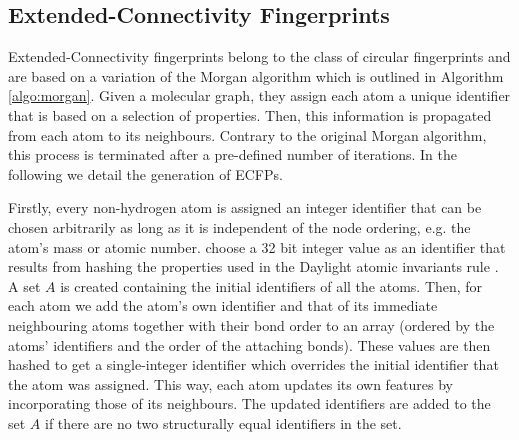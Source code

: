 \subsection{Extended-Connectivity Fingerprints}
\label{sec:circ_finger}

Extended-Connectivity fingerprints belong to the class of circular fingerprints and are based on a variation of the Morgan algorithm \citep{morgan} which is outlined in Algorithm \ref{algo:morgan}. Given a molecular graph, they assign each atom a unique identifier that is based on a selection of properties. Then, this information is propagated from each atom to its neighbours. Contrary to the original Morgan algorithm, this process is terminated after a pre-defined number of iterations. In the following we detail the generation of ECFPs.


Firstly, every non-hydrogen atom is assigned an integer identifier that can be chosen arbitrarily as long as it is independent of the node ordering, e.g. the atom's mass or atomic number. \cite{ECFP} choose a 32 bit integer value as an identifier that results from hashing the properties used in the Daylight atomic invariants rule \citep{smiles2}. A set $A$ is created containing the initial identifiers of all the atoms. Then, for each atom we add the atom's own identifier and that of its immediate neighbouring atoms together with their bond order to an array (ordered by the atoms' identifiers and the order of the attaching bonds). These values are then hashed to get a single-integer identifier which overrides the initial identifier that the atom was assigned. This way, each atom updates its own features by incorporating those of its neighbours. The updated identifiers are added to the set $A$ if there are no two structurally equal identifiers in the set.

